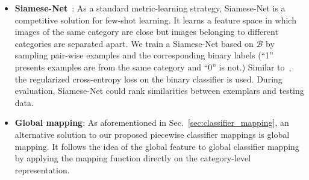 \documentclass[10pt,twocolumn,letterpaper]{article}
\begin{document}
\begin{itemize}
\item \textbf{Siamese-Net}~\cite{siamese16ICML}: As a standard metric-learning strategy, Siamese-Net is a competitive solution for few-shot learning. It learns a feature space in which images of the same category are close but images belonging to different categories are separated apart. We train a Siamese-Net based on $\mathcal{B}$ by sampling pair-wise examples and the corresponding binary labels (``1'' presents examples are from the same category and ``0'' is not.) Similar to~\cite{siamese16ICML}, the regularized cross-entropy loss on the binary classifier is used. During evaluation, Siamese-Net could rank similarities between exemplars and testing data.

\item \textbf{Global mapping}: As aforementioned in Sec.~\ref{sec:classifier_mapping}, an alternative solution to our proposed piecewise classifier mappings is global mapping. It follows the idea of the global feature to global classifier mapping by applying the mapping function directly on the category-level representation.
\end{itemize}
\end{document}
